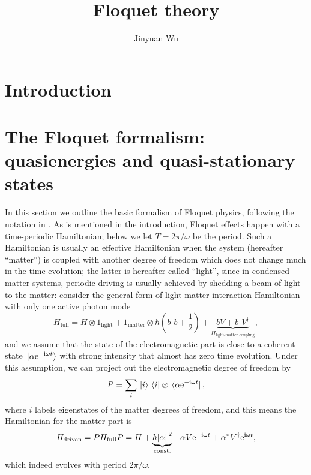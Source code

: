 \documentclass[hyperref, a4paper]{article}
\title{Floquet theory}
\author{Jinyuan Wu}
\newcommand*{\ii}{\mathrm{i}}
\newcommand*{\ee}{\mathrm{e}}
\newcommand*{\const}{\mathrm{const}}
\begin{document}
\maketitle

\section{Introduction} 

\section{The Floquet formalism: quasienergies and quasi-stationary states}

In this section we outline the basic formalism of Floquet physics,
following the notation in \cite{rudner2020floquet}.
As is mentioned in the introduction,
Floquet effects happen with a time-periodic Hamiltonian;
below we let $T = 2 \pi / \omega$ be the period.
Such a Hamiltonian is usually an effective Hamiltonian
when the system (hereafter ``matter'')
is coupled with another degree of freedom
which does not change much in the time evolution;
the latter is hereafter called ``light'',
since in condensed matter systems, 
periodic driving is usually achieved by 
shedding a beam of light to the matter:
consider the general form of light-matter interaction Hamiltonian 
with only one active photon mode
\begin{equation}
    H_{\text{full}} = 
    H \otimes 1_{\text{light}} + 1_{\text{matter}} \otimes \hbar \left(
        b^\dagger b + \frac{1}{2} 
    \right) 
    + \underbrace{
        b V + b^\dagger V^\dagger  
    }_{H_{\text{light-matter coupling}}} ,
    \label{eq:full-light-matter}
\end{equation}
and we assume that the state of the electromagnetic part 
is close to a coherent state $\ket*{\alpha \ee^{- \ii \omega t}}$ 
with strong intensity that almost has zero time evolution. 
Under this assumption, we can project out the electromagnetic degree of freedom by 
\begin{equation}
    P = \sum_{i} \ket*{i} \bra*{i} \otimes \bra*{\alpha \ee^{- \ii \omega t}}, 
    \label{eq:from-extended-to-matter}
\end{equation} 
where $i$ labels eigenstates of the matter degrees of freedom,
and this means the Hamiltonian for the matter part is 
\begin{equation}
    H_{\text{driven}} = P H_{\text{full}} P = 
    H + \underbrace{\hbar \abs*{\alpha}^2 }_{\const.} + \alpha V \ee^{- \ii \omega t} + \alpha^* V^\dagger \ee^{\ii \omega t},
\end{equation}
which indeed evolves with period $2\pi / \omega$.
\end{document}
